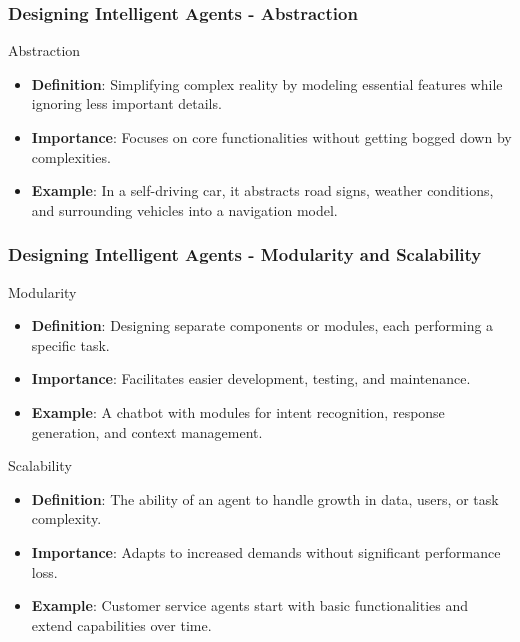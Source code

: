 \documentclass[aspectratio=169]{beamer}
\begin{document}
\begin{frame}[fragile]
    \frametitle{Designing Intelligent Agents - Abstraction}
    \begin{block}{Abstraction}
        \begin{itemize}
            \item \textbf{Definition}: Simplifying complex reality by modeling essential features while ignoring less important details.
            \item \textbf{Importance}: Focuses on core functionalities without getting bogged down by complexities.
            \item \textbf{Example}: In a self-driving car, it abstracts road signs, weather conditions, and surrounding vehicles into a navigation model.
        \end{itemize}
    \end{block}
\end{frame}

\begin{frame}[fragile]
    \frametitle{Designing Intelligent Agents - Modularity and Scalability}
    \begin{block}{Modularity}
        \begin{itemize}
            \item \textbf{Definition}: Designing separate components or modules, each performing a specific task.
            \item \textbf{Importance}: Facilitates easier development, testing, and maintenance.
            \item \textbf{Example}: A chatbot with modules for intent recognition, response generation, and context management.
        \end{itemize}
    \end{block}

    \begin{block}{Scalability}
        \begin{itemize}
            \item \textbf{Definition}: The ability of an agent to handle growth in data, users, or task complexity.
            \item \textbf{Importance}: Adapts to increased demands without significant performance loss.
            \item \textbf{Example}: Customer service agents start with basic functionalities and extend capabilities over time.
        \end{itemize}
    \end{block}
\end{frame}
\end{document}
